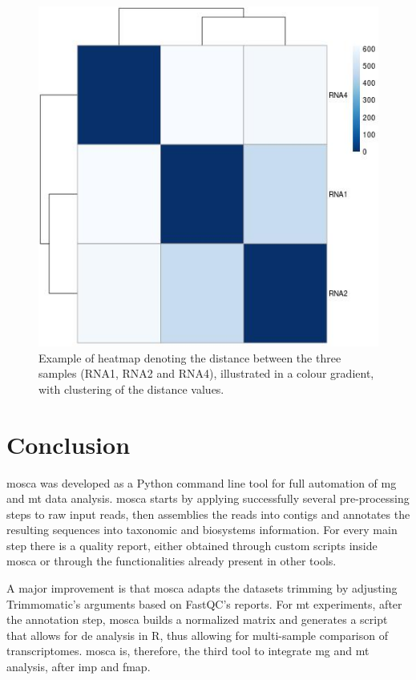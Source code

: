 \documentclass[
  oneside,
  11pt, a4paper,
  footinclude=true,
  headinclude=true,
  cleardoublepage=empty
]{scrbook}
\begin{document}
    \begin{figure}[!h]    
    \includegraphics[width=\columnwidth]{FiguresUndTables/Results/Analyzing/sampledist.jpg}
    \caption{Example of heatmap denoting the distance between the three samples (RNA1, RNA2 and RNA4), illustrated in a colour gradient, with clustering of the distance values.}
    \label{fig:sampledist}
    \end{figure}
    
    \chapter{Conclusion}
    
    \gls{mosca} was developed as a Python command line tool for full automation of \gls{mg} and \gls{mt} data analysis. \gls{mosca} starts by applying successfully several pre-processing steps to raw input reads, then assemblies the reads into contigs and annotates the resulting sequences into taxonomic and biosystems information. For every main step there is a quality report, either obtained through custom scripts inside \gls{mosca} or through the functionalities already present in other tools. 
    
    A major improvement is that \gls{mosca} adapts the datasets trimming by adjusting Trimmomatic's arguments based on FastQC's reports. For \gls{mt} experiments, after the annotation step, \gls{mosca} builds a normalized matrix and generates a script that allows for \gls{de} analysis in R, thus allowing for multi-sample comparison of transcriptomes. \gls{mosca} is, therefore, the third tool to integrate \gls{mg} and \gls{mt} analysis, after \gls{imp} and \gls{fmap}.
    
\end{document}
